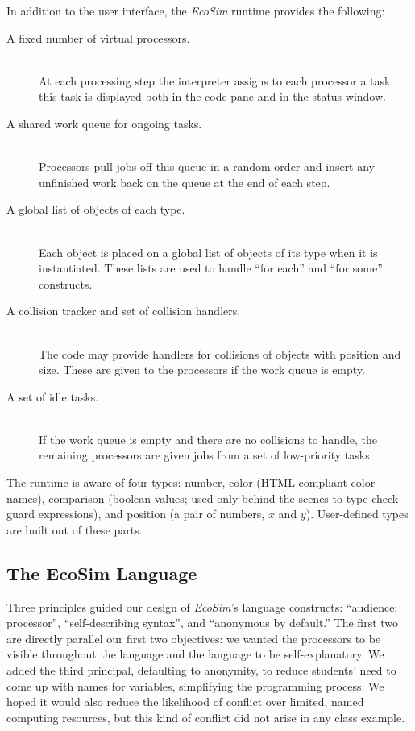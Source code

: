 \documentclass{sig-alternate}
\newcommand{\EcoSim}{\emph{EcoSim}}
\newcommand{\code}[1]{``\textsf{#1}''}
\begin{document}
In addition to the user interface, the \EcoSim{} runtime provides the following:
\begin{description}
	\item[A fixed number of virtual processors.]~\\
		At each processing step the interpreter assigns to each processor a task;
		this task is displayed both in the code pane and in the status window.
	\item[A shared work queue for ongoing tasks.]~\\
		Processors pull jobs off this queue in a random order
		and insert any unfinished work back on the queue at the end of each step.
	\item[A global list of objects of each type.]~\\
		Each object is placed on a global list of objects of its type when it is instantiated.
		These lists are used to handle \code{for each} and \code{for some} constructs.
	\item[A collision tracker and set of collision handlers.]~\\
		The code may provide handlers for collisions of objects with position and size.
		These are given to the processors if the work queue is empty.
	\item[A set of idle tasks.]~\\
		If the work queue is empty and there are no collisions to handle,
		the remaining processors are given jobs from a set of low-priority tasks.
\end{description}

The runtime is aware of four types:
number, color (HTML-compliant color names), 
comparison (boolean values; used only behind the scenes to type-check guard expressions),
and position (a pair of numbers, $x$ and $y$).
User-defined types are built out of these parts.


\subsection{The EcoSim Language}
Three principles guided our design of \EcoSim{}'s language constructs:
``audience: processor'', ``self-describing syntax'', and ``anonymous by default.''
The first two are directly parallel our first two objectives:
we wanted the processors to be visible throughout the language
and the language to be self-explanatory.
We added the third principal, defaulting to anonymity,
to reduce students' need to come up with names for variables,
simplifying the programming process.
We hoped it would also reduce the likelihood of conflict over limited, named computing resources,
but this kind of conflict did not arise in any class example.
\end{document}
